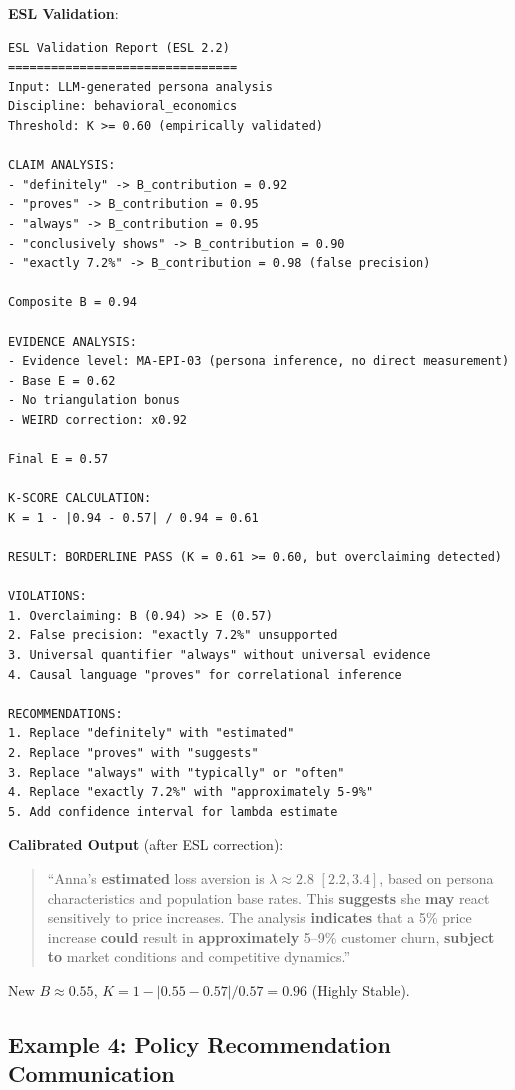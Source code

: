 \documentclass[11pt,a4paper]{article}
\begin{document}
\textbf{ESL Validation}:

\begin{lstlisting}[caption={ESL Validation Output}]
ESL Validation Report (ESL 2.2)
================================
Input: LLM-generated persona analysis
Discipline: behavioral_economics
Threshold: K >= 0.60 (empirically validated)

CLAIM ANALYSIS:
- "definitely" -> B_contribution = 0.92
- "proves" -> B_contribution = 0.95
- "always" -> B_contribution = 0.95
- "conclusively shows" -> B_contribution = 0.90
- "exactly 7.2%" -> B_contribution = 0.98 (false precision)

Composite B = 0.94

EVIDENCE ANALYSIS:
- Evidence level: MA-EPI-03 (persona inference, no direct measurement)
- Base E = 0.62
- No triangulation bonus
- WEIRD correction: x0.92

Final E = 0.57

K-SCORE CALCULATION:
K = 1 - |0.94 - 0.57| / 0.94 = 0.61

RESULT: BORDERLINE PASS (K = 0.61 >= 0.60, but overclaiming detected)

VIOLATIONS:
1. Overclaiming: B (0.94) >> E (0.57)
2. False precision: "exactly 7.2%" unsupported
3. Universal quantifier "always" without universal evidence
4. Causal language "proves" for correlational inference

RECOMMENDATIONS:
1. Replace "definitely" with "estimated"
2. Replace "proves" with "suggests"
3. Replace "always" with "typically" or "often"
4. Replace "exactly 7.2%" with "approximately 5-9%"
5. Add confidence interval for lambda estimate
\end{lstlisting}

\textbf{Calibrated Output} (after ESL correction):

\begin{quote}
``Anna's \textbf{estimated} loss aversion is $\lambda \approx 2.8$ $[2.2, 3.4]$, based on persona characteristics and population base rates. This \textbf{suggests} she \textbf{may} react sensitively to price increases. The analysis \textbf{indicates} that a 5\% price increase \textbf{could} result in \textbf{approximately} 5--9\% customer churn, \textbf{subject to} market conditions and competitive dynamics.''
\end{quote}

New $B \approx 0.55$, $K = 1 - |0.55 - 0.57| / 0.57 = 0.96$ (Highly Stable).

\subsection{Example 4: Policy Recommendation Communication}
\end{document}
